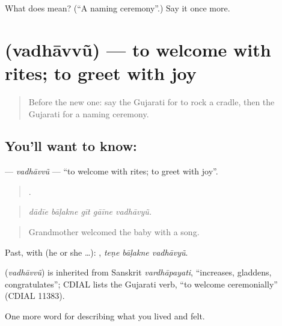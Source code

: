 \begin{tcolorbox}[breakable,colback=teal!4,colframe=teal!35!black,title={Before you move on}]
What does  mean? (\textquotedblleft{}A naming ceremony\textquotedblright{}.) Say it once more.
\end{tcolorbox}
\section[\texorpdfstring{\gu{વધાવવું} (vadhāvvũ)}{વધાવવું (vadhāvvũ)}]{ (vadhāvvũ) — to welcome with rites; to greet with joy}

\label{lesson:GU-C496-vadhavvu}



\begin{quote}
Before the new one: say the Gujarati for to rock a cradle, then the Gujarati for a naming ceremony.
\end{quote}

\subsection*{You'll want to know: }
\textbf{} — \emph{vadhāvvũ} — \textquotedblleft{}to welcome with rites; to greet with joy\textquotedblright{}.

\begin{quote}
    .
\end{quote}

\begin{quote}
\emph{dādīe bāḷakne gīt gāīne vadhāvyũ.}
\end{quote}

\begin{quote}
Grandmother welcomed the baby with a song.
\end{quote}

Past, with  (he or she …):   , \emph{teṇe bāḷakne vadhāvyũ}.

\begin{cousinweb}
\textbf{} (\emph{vadhāvvũ}) is inherited from Sanskrit \emph{vardhāpayati}, \textquotedblleft{}increases, gladdens, congratulates\textquotedblright{}; CDIAL lists the Gujarati verb, \textquotedblleft{}to welcome ceremonially\textquotedblright{} (CDIAL 11383).
\end{cousinweb}

\begin{grammarlens}[title={What you've built}]
One more word for describing what you lived and felt.
\end{grammarlens}


